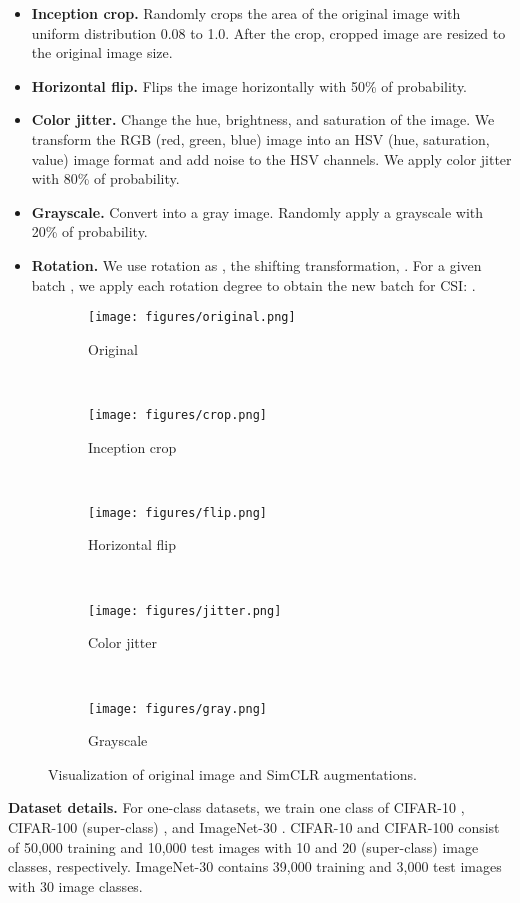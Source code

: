 \documentclass{article}
\begin{document}
\begin{itemize}
\item \textbf{Inception crop.} Randomly crops the area of the original image with uniform distribution 0.08 to 1.0. After the crop, cropped image are resized to the original image size.
\item \textbf{Horizontal flip.} Flips the image horizontally with 50\% of probability. 
\item \textbf{Color jitter.} Change the hue, brightness, and saturation of the image. We transform the RGB (red, green, blue) image into an HSV (hue, saturation, value) image format and add noise to the HSV channels. We apply color jitter with 80\% of probability.
\item \textbf{Grayscale.} Convert into a gray image. Randomly apply a grayscale with 20\% of probability.
\item \textbf{Rotation.} We use rotation as , the shifting transformation, . For a given batch , we apply each rotation degree to obtain the new batch for CSI: .
\end{itemize}

\begin{figure*}[h]
\centering
\begin{subfigure}{0.19\textwidth}
\texttt{[image: figures/original.png]}
\caption{Original}
\end{subfigure}
~\begin{subfigure}{0.19\textwidth}
\texttt{[image: figures/crop.png]}
\caption{Inception crop}
\end{subfigure}
\centering
~\begin{subfigure}{0.19\textwidth}
\texttt{[image: figures/flip.png]}
\caption{Horizontal flip}
\end{subfigure}
\centering
~\begin{subfigure}{0.19\textwidth}
\texttt{[image: figures/jitter.png]}
\caption{Color jitter}
\end{subfigure}
\centering
~\begin{subfigure}{0.19\textwidth}
\texttt{[image: figures/gray.png]}
\caption{Grayscale}
\end{subfigure}
\caption{
Visualization of original image and SimCLR augmentations.
}\label{fig:simclr_aug}
\end{figure*}

 

\clearpage
\textbf{Dataset details.} For one-class datasets, we train one class of CIFAR-10 \citep{krizhevsky2009learning}, CIFAR-100 (super-class) \citep{krizhevsky2009learning}, and ImageNet-30 \citep{hendrycks2019using_self}. CIFAR-10 and  CIFAR-100 consist of 50,000 training and 10,000 test images with 10 and 20 (super-class) image classes, respectively. ImageNet-30 contains 39,000 training and 3,000 test images with 30 image classes.
\end{document}
